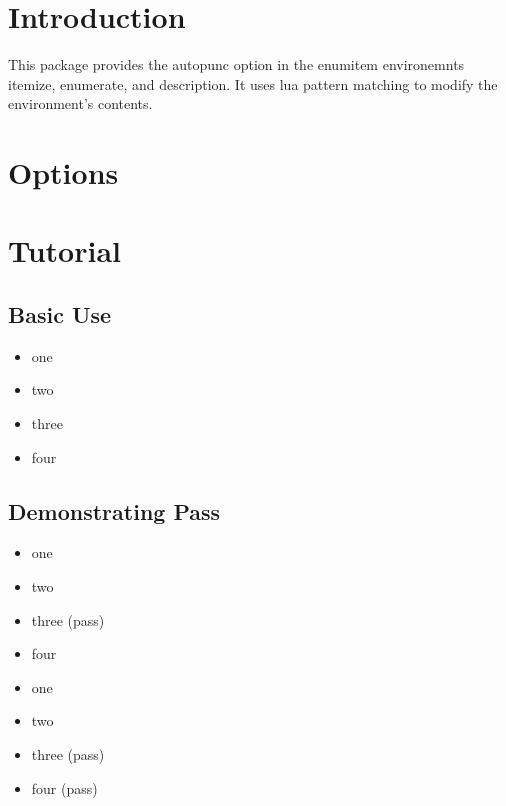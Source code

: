 \documentclass[11pt,parskip=half]{scrartcl}
\author{Kale Ewasiuk (\url{kalekje@gmail.com})}
\date{\today}
\begin{document}
\section{Introduction}
This package provides the autopunc option in the
enumitem environemnts itemize, enumerate, and description.
It uses lua pattern matching to modify the environment's contents.

\section{Options}

\section{Tutorial}
\subsection{Basic Use}

\begin{LTXexample}
\begin{itemize}[autopunc]
    \item one
    \item two
    \item three
    \item four
\end{itemize}
\end{LTXexample}


\subsection{Demonstrating Pass}

\begin{LTXexample}
\begin{itemize}[autopunc]
    \item one
    \item two
    \item three (pass) \APpass
    \item four
\end{itemize}
\end{LTXexample}

\begin{LTXexample}
\begin{itemize}[autopunc]
    \item one
    \item two
    \item three (pass) \APpass
    \item four (pass) \APpass
\end{itemize}
\end{LTXexample}
\end{document}
